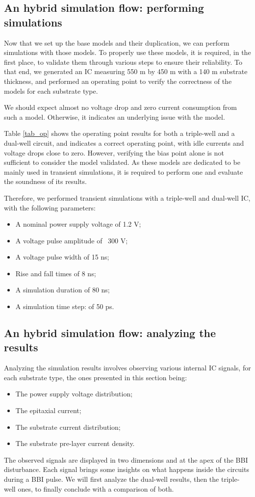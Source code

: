 \subsection{An hybrid simulation flow: performing simulations}
	Now that we set up the base models and their duplication, we can perform simulations with those models.
	To properly use these models, it is required, in the first place, to validate them through various steps to ensure their reliability.
	To that end, we generated an IC measuring 550 \textmu m by 450 \textmu m with a 140 \textmu m substrate thickness, and performed an operating point to verify the correctness of the models for each substrate type.
	
	We should expect almost no voltage drop and zero current consumption from such a model.
	Otherwise, it indicates an underlying issue with the model.

	Table \ref{tab_op} shows the operating point results for both a triple-well and a dual-well circuit, and indicates a correct operating point, with idle currents and voltage drops close to zero.
	However, verifying the bias point alone is not sufficient to consider the model validated.
	As these models are dedicated to be mainly used in transient simulations, it is required to perform one and evaluate the soundness of its results.

	Therefore, we performed transient simulations with a triple-well and dual-well IC, with the following parameters:
	\begin{itemize}
		\item A nominal power supply voltage of 1.2 V;
		\item A voltage pulse amplitude of \textpm\ 300 V;
		\item A voltage pulse width of 15 ns;
		\item Rise and fall times of 8 ns;
		\item A simulation duration of 80 ns;
		\item A simulation time step: of 50 ps.
	\end{itemize}

\subsection{An hybrid simulation flow: analyzing the results}
	Analyzing the simulation results involves observing various internal IC signals, for each substrate type, the ones presented in this section being:
	\begin{itemize}
		\item The power supply voltage distribution;
		\item The epitaxial current;
		\item The substrate current distribution;
		\item The substrate pre-layer current density.
	\end{itemize}
	The observed signals are displayed in two dimensions and at the apex of the BBI disturbance.
	Each signal brings some insights on what happens inside the circuits during a BBI pulse.
	We will first analyze the dual-well results, then the triple-well ones, to finally conclude with a comparison of both.
	
